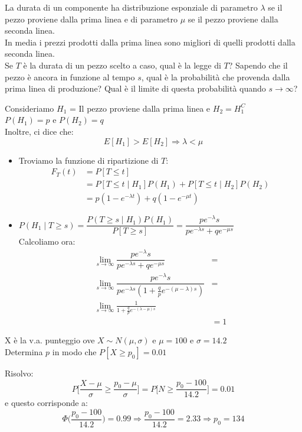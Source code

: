 \documentclass[12pt]{report}
\newcounter{exercise}
\begin{document}
	 \begin{exercise}{}{}
	 	\begin{assignment}{}{}
	 		La durata di un componente ha distribuzione esponziale di parametro $\lambda$ se il pezzo proviene dalla prima linea e di parametro $\mu$ se il pezzo proviene dalla seconda linea. \\
	 		In media i prezzi prodotti dalla prima linea sono migliori di quelli prodotti dalla seconda linea.\\
	 		Se $T$ è la durata di un pezzo scelto a caso, qual è la legge di $T$? Sapendo che il pezzo è ancora in funzione al tempo $s$, qual è la probabilità che provenda dalla prima linea di produzione? Qual è il limite di questa probabilità quando $s \to \infty$?
	 	\end{assignment}
	 	Consideriamo $H_1$ = Il pezzo proviene dalla prima linea e $H_2 = H_1^C$ \\
	 	$P(H_1) = p$ e $P(H_2) = q$ \\
	 	Inoltre, ci dice che:
	 	\[
	 	E[H_1] > E[H_2] \Rightarrow \lambda < \mu
	 	\]
	 	\begin{itemize}
	 		\item Troviamo la funzione di ripartizione di $T$:
	 		\begin{align*}
	 			F_T(t) &= P[T \leq t] \\
	 			&= P[T \leq t \mid H_1] P(H_1) + P[T \leq t \mid H_2]P(H_2) \\
	 			&= p(1 - e^{-\lambda t}) + q(1 - e^{-\mu t})
	 		\end{align*}
	 		\item $P(H_1 \mid T \geq s) = \dfrac{P(T \geq s  \mid H_1)P(H_1)}{P[T \geq s]} = \dfrac{pe^{-\lambda}s}{pe^{-\lambda s} + qe^{-\mu s}}$ \\
	 		Calcoliamo ora:
	 		\begin{align*}
	 			\lim_{s \to \infty}\dfrac{pe^{-\lambda}s}{pe^{-\lambda s} + qe^{-\mu s}} &= \\
	 			\lim_{s\to\infty}\dfrac{pe^{-\lambda}s}{pe^{-\lambda s}(1 + \frac{q}{p}e^{-(\mu -\lambda)s})} &=\\
	 			\lim_{s\to\infty}\frac{1}{1 + \frac{q}{p}e^{-(\lambda-\mu)s}} \\
	 			&= 1
	 		\end{align*}
	 	\end{itemize}
	 \end{exercise}
	 \begin{exercise}{}{}
	 	\begin{assignment}{}{}
	 		X è la v.a. punteggio ove $X \sim N(\mu, \sigma)$ e $\mu = 100$ e $\sigma = 14.2$ \\
	 		Determina $p$ in modo che $P[X \geq p_0] = 0.01$
	 	\end{assignment}
	 	Risolvo:
	 	\[
	 	P\Big[\frac{X - \mu}{\sigma} \geq \frac{p_0 -\mu}{\sigma}\Big] = P\Big[N \geq \frac{p_0 - 100}{14.2}\Big] = 0.01
	 	\]
	 	e questo corrisponde a:
	 	\[
	 	\Phi\Bigg(\frac{p_0 - 100}{14.2}\Bigg) = 0.99 \Rightarrow \frac{p_0 - 100}{14.2} = 2.33 \Rightarrow p_0 = 134
	 	\]
	 \end{exercise}
\end{document}
